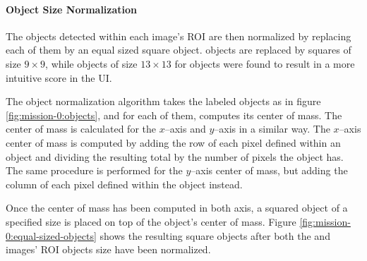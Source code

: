 \paragraph{Object Size Normalization} \label{paragraph:case-study:impl:object-normalization}
The objects detected within each image's ROI are then normalized by replacing each of them by an equal sized square object. \usno objects are replaced by squares of size $9 \times 9$, while objects of size $13 \times 13$ for \panstarrs objects were found to result in a more intuitive score in the UI. 

The object normalization algorithm takes the labeled objects as in figure \ref{fig:mission-0:objects}, and for each of them, computes its center of mass. The center of mass is calculated for the $x$--axis and $y$--axis in a similar way. The $x$--axis center of mass is computed by adding the row of each pixel defined within an object and dividing the resulting total by the number of pixels the object has. The same procedure is performed for the $y$--axis center of mass, but adding the column of each pixel defined within the object instead. 

Once the center of mass has been computed in both axis, a squared object of a specified size is placed on top of the object's center of mass. Figure \ref{fig:mission-0:equal-sized-objects} shows the resulting square objects after both the \usno and \panstarrs images' ROI objects size have been normalized.

